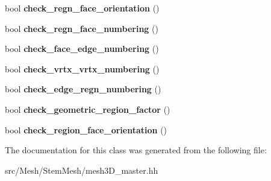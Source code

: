 \begin{DoxyCompactItemize}
bool {\bfseries check\+\_\+regn\+\_\+face\+\_\+orientation} ()
\item 
\mbox{\label{classStemMesh3D_1_1mesh3Dv__cmaster_ae6ed41dead094072bf7b072a411549ac}} 
bool {\bfseries check\+\_\+regn\+\_\+face\+\_\+numbering} ()
\item 
\mbox{\label{classStemMesh3D_1_1mesh3Dv__cmaster_ae199281df280a743d3a3434fad887545}} 
bool {\bfseries check\+\_\+face\+\_\+edge\+\_\+numbering} ()
\item 
\mbox{\label{classStemMesh3D_1_1mesh3Dv__cmaster_adde5723ce5cebf94b27f989a816eb5d6}} 
bool {\bfseries check\+\_\+vrtx\+\_\+vrtx\+\_\+numbering} ()
\item 
\mbox{\label{classStemMesh3D_1_1mesh3Dv__cmaster_ac4115a2a03c5cb16023f0b5ec39a7b20}} 
bool {\bfseries check\+\_\+edge\+\_\+regn\+\_\+numbering} ()
\item 
\mbox{\label{classStemMesh3D_1_1mesh3Dv__cmaster_abfdfbcde7b590b7930861e1f1353686c}} 
bool {\bfseries check\+\_\+geometric\+\_\+region\+\_\+factor} ()
\item 
\mbox{\label{classStemMesh3D_1_1mesh3Dv__cmaster_a042cdbe7de03c54c4d54edf5be0d6bba}} 
bool {\bfseries check\+\_\+region\+\_\+face\+\_\+orientation} ()
\end{DoxyCompactItemize}


The documentation for this class was generated from the following file\+:\begin{DoxyCompactItemize}
\item 
src/\+Mesh/\+Stem\+Mesh/mesh3\+D\+\_\+master.\+hh\end{DoxyCompactItemize}
